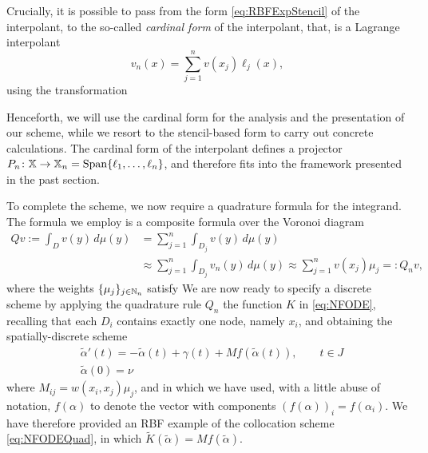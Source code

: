 \documentclass[a4paper]{siamart190516}
\begin{document}
Crucially, it is possible to pass from the form \cref{eq:RBFExpStencil} of the
interpolant, to the so-called \textit{cardinal form} of the interpolant, that, is a
Lagrange interpolant
\[
  v_n(x) = \sum_{j=1}^{n} v(x_j) \ell_j(x),
\]
using the transformation

Henceforth, we will use the cardinal form for the analysis and the presentation of
our scheme, while we resort to the stencil-based form to carry out concrete
calculations. The cardinal form of the interpolant defines a projector $P_n \colon \mathbb{X} \to
\mathbb{X}_n = \operatorname{Span} \{ \ell_1, \ldots, \ell_n \}$, and therefore fits into the framework
presented in the past section.

To complete the scheme, we now require a quadrature formula for the integrand. The
formula we employ is a composite formula over the Voronoi diagram
\[
  \begin{aligned}
  Q v := \int_{D} v(y)\,d \mu(y) 
    & = \sum_{j=1}^n \int_{D_j} v(y) \,d \mu(y) \\
    & \approx \sum_{j = 1}^n \int_{D_j} v_n(y) \,d \mu(y)
      \approx \sum_{j = 1}^n v(x_j) \mu_j =: Q_n v,
  \end{aligned}
\]
where the weights $\{ \mu_j \}_{j \in \mathbb{N}_n}$ satisfy
We are now ready to specify a discrete scheme by applying the quadrature rule $Q_n$
the function $K$ in \cref{eq:NFODE}, recalling that each $D_i$ contains exactly
one node, namely $x_i$, and obtaining the spatially-discrete scheme
\[
  \begin{aligned}
  & \tilde \alpha'(t) = -\tilde \alpha(t) + \gamma(t) 
    + M f(\tilde \alpha(t)), \qquad t \in J \\
  & \tilde \alpha(0) = \nu
  \end{aligned}
\]
where $M_{ij} = w(x_i,x_j)\mu_j$, and in which we have used, with a little abuse of
notation, $f(\alpha)$ to denote the vector with components $(f(\alpha))_i =
f(\alpha_i)$. We have therefore provided an RBF example of the collocation scheme
\cref{eq:NFODEQuad}, in which $\tilde K(\tilde \alpha) = M f(\tilde \alpha)$.



\end{document}
